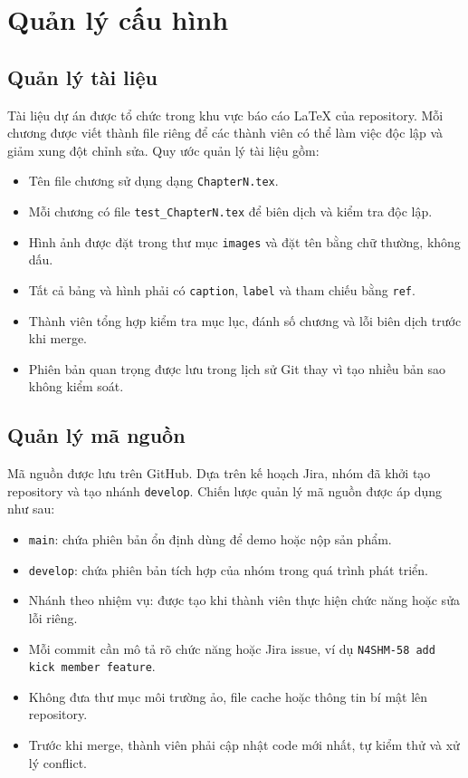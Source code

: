 \section{Quản lý cấu hình}

\subsection{Quản lý tài liệu}

Tài liệu dự án được tổ chức trong khu vực báo cáo LaTeX của repository. Mỗi chương được viết thành file riêng để các thành viên có thể làm việc độc lập và giảm xung đột chỉnh sửa. Quy ước quản lý tài liệu gồm:

\begin{itemize}
    \item Tên file chương sử dụng dạng \texttt{ChapterN.tex}.
    \item Mỗi chương có file \texttt{test\_ChapterN.tex} để biên dịch và kiểm tra độc lập.
    \item Hình ảnh được đặt trong thư mục \texttt{images} và đặt tên bằng chữ thường, không dấu.
    \item Tất cả bảng và hình phải có \texttt{caption}, \texttt{label} và tham chiếu bằng \texttt{ref}.
    \item Thành viên tổng hợp kiểm tra mục lục, đánh số chương và lỗi biên dịch trước khi merge.
    \item Phiên bản quan trọng được lưu trong lịch sử Git thay vì tạo nhiều bản sao không kiểm soát.
\end{itemize}

\subsection{Quản lý mã nguồn}

Mã nguồn được lưu trên GitHub. Dựa trên kế hoạch Jira, nhóm đã khởi tạo repository và tạo nhánh \texttt{develop}. Chiến lược quản lý mã nguồn được áp dụng như sau:

\begin{itemize}
    \item \texttt{main}: chứa phiên bản ổn định dùng để demo hoặc nộp sản phẩm.
    \item \texttt{develop}: chứa phiên bản tích hợp của nhóm trong quá trình phát triển.
    \item Nhánh theo nhiệm vụ: được tạo khi thành viên thực hiện chức năng hoặc sửa lỗi riêng.
    \item Mỗi commit cần mô tả rõ chức năng hoặc Jira issue, ví dụ \texttt{N4SHM-58 add kick member feature}.
    \item Không đưa thư mục môi trường ảo, file cache hoặc thông tin bí mật lên repository.
    \item Trước khi merge, thành viên phải cập nhật code mới nhất, tự kiểm thử và xử lý conflict.
\end{itemize}

